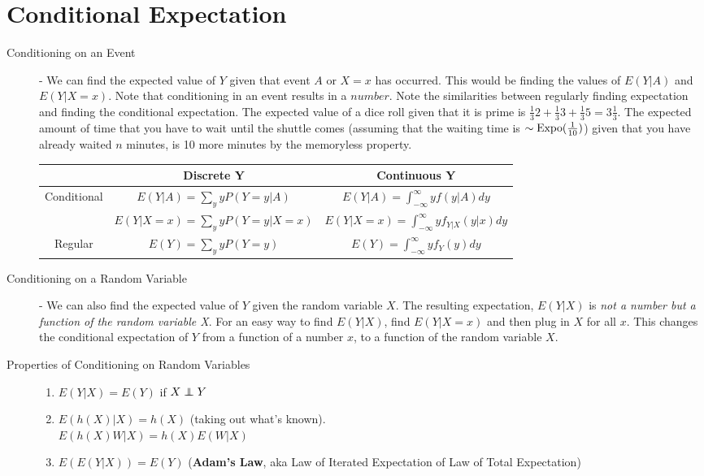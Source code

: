 \documentclass[11pt]{article}
\theoremstyle{definition}
\theoremstyle{remark}
\newcommand\independent{\protect\mathpalette{\protect\independenT}{\perp}}
\def\independenT#1#2{\mathrel{\rlap{$#1#2$}\mkern2mu{#1#2}}}
\newcommand{\Expo}{\textnormal{Expo}}
\begin{document}
\section{Conditional Expectation}
\begin{description}
	\item[Conditioning on an Event] - We can find the expected value of $Y$ given that event $A$ or $X=x$ has occurred. This would be finding the values of $E(Y|A)$ and $E(Y|X = x)$. Note that conditioning in an event results in a $number$. Note the similarities between regularly finding expectation and finding the conditional expectation. The expected value of a dice roll given that it is prime is $\frac{1}{3}2 + \frac{1}{3}3 + \frac{1}{3}5 = 3\frac{1}{3}$. The expected amount of time that you have to wait until the shuttle comes (assuming that the waiting time is $\sim \Expo(\frac{1}{10})$) given that you have already waited $n$ minutes, is 10 more minutes by the memoryless property.
		\begin{table}[htb!]
		   \centering
			\begin{tabular}{ccc}
			\hline
				 ~& \textbf{Discrete Y} & \textbf{Continuous Y} \\
			\hline
				 Conditional & $E(Y|A) = \sum_y yP(Y=y|A)$ & $E(Y|A) = \int_{-\infty}^\infty yf(y|A)dy$ \\ 
				 ~ & $E(Y|X=x) = \sum_y yP(Y=y|X=x)$ & $E(Y|X=x) =\int_{-\infty}^\infty yf_{Y|X}(y|x)dy$ \\
			\hline
			Regular & $E(Y) = \sum_y yP(Y=y)$ & $E(Y) =\int_{-\infty}^\infty yf_Y(y)dy$ \\
 
			\hline
			\end{tabular}
		\end{table}
	\vspace{-.45 cm}
	\item[Conditioning on a Random Variable] - We can also find the expected value of $Y$ given the random variable $X$. The resulting expectation, $E(Y|X)$ is \emph{not a number but a function of the random variable X}. For an easy way to find $E(Y|X)$, find $E(Y|X = x)$ and then plug in $X$ for all $x$. This changes the conditional expectation of $Y$ from a function of a number $x$, to a function of the random variable $X$.
	\item[Properties of Conditioning on Random Variables] \quad
	\begin{enumerate}
		\item $E(Y|X) = E(Y)$ if $X \independent Y$
		\item $E(h(X)|X) = h(X)$ (taking out what's known). \\
			$E(h(X)W|X) = h(X)E(W|X)$
		\item $E(E(Y|X)) = E(Y)$ (\textbf{Adam's Law}, aka Law of Iterated Expectation of Law of Total Expectation)
	\end{enumerate}


\end{description}
\end{document}
